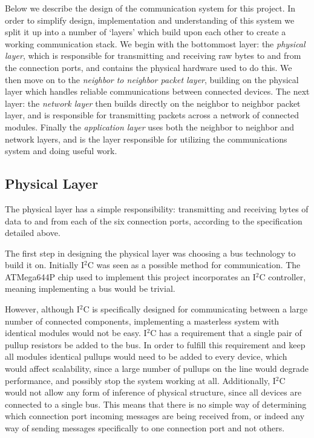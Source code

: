 Below we describe the design of the communication system for this project. In order to simplify design, implementation and understanding of this system we split it up into a number of `layers' which build upon each other to create a working communication stack. We begin with the bottommost layer: the \emph{physical layer}, which is responsible for transmitting and receiving raw bytes to and from the connection ports, and contains the physical hardware used to do this. We then move on to the \emph{neighbor to neighbor packet layer}, building on the physical layer which handles reliable communications between connected devices. The next layer: the \emph{network layer} then builds directly on the neighbor to neighbor packet layer, and is responsible for transmitting packets across a network of connected modules. Finally the \emph{application layer} uses both the neighbor to neighbor and network layers, and is the layer responsible for utilizing the communications system and doing useful work.

\subsection{Physical Layer}

The physical layer has a simple responsibility: transmitting and receiving bytes of data to and from each of the six connection ports, according to the specification detailed above. 

The first step in designing the physical layer was choosing a bus technology to build it on. Initially I$^{2}$C was seen as a possible method for communication. The ATMega644P chip used to implement this project incorporates an I$^{2}$C controller, meaning implementing a bus would be trivial. 

However, although I$^{2}$C is specifically designed for communicating between a large number of connected components, implementing a masterless system with identical modules would not be easy. I$^{2}$C has a requirement that a single pair of pullup resistors be added to the bus. In order to fulfill this requirement and keep all modules identical pullups would need to be added to every device, which would affect scalability, since a large number of pullups on the line would degrade performance, and possibly stop the system working at all. Additionally, I$^{2}$C would not allow any form of inference of physical structure, since all devices are connected to a single bus. This means that there is no simple way of determining which connection port incoming messages are being received from, or indeed any way of sending messages specifically to one connection port and not others.

